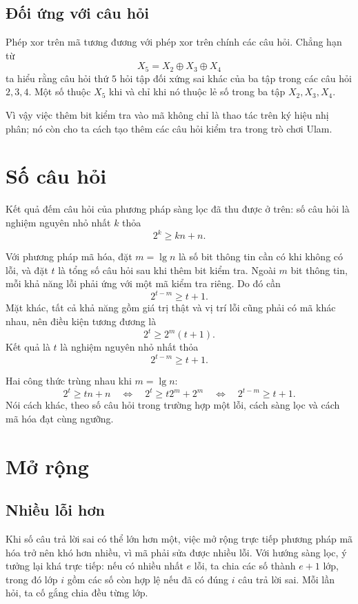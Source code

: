 \documentclass[11pt]{article}
\newcommand{\xor}{\oplus}
\begin{document}
\subsection{Đối ứng với câu hỏi}

Phép xor trên mã tương đương với phép xor trên chính các câu hỏi. Chẳng hạn
từ
\[
  X_5 = X_2 \xor X_3 \xor X_4
\]
ta hiểu rằng câu hỏi thứ \(5\) hỏi tập đối xứng sai khác của ba tập trong
các câu hỏi \(2,3,4\). Một số thuộc \(X_5\) khi và chỉ khi nó thuộc lẻ số
trong ba tập \(X_2,X_3,X_4\).

Vì vậy việc thêm bit kiểm tra vào mã không chỉ là thao tác trên ký hiệu nhị
phân; nó còn cho ta cách tạo thêm các câu hỏi kiểm tra trong trò chơi Ulam.

\section{Số câu hỏi}

Kết quả đếm câu hỏi của phương pháp sàng lọc đã thu được ở trên: số câu hỏi
là nghiệm nguyên nhỏ nhất \(k\) thỏa
\[
  2^k \ge kn+n.
\]

Với phương pháp mã hóa, đặt \(m=\lg n\) là số bit thông tin cần có khi không
có lỗi, và đặt \(t\) là tổng số câu hỏi sau khi thêm bit kiểm tra. Ngoài
\(m\) bit thông tin, mỗi khả năng lỗi phải ứng với một mã kiểm tra riêng.
Do đó cần
\[
  2^{t-m}\ge t+1.
\]
Mặt khác, tất cả khả năng gồm giá trị thật và vị trí lỗi cũng phải có mã
khác nhau, nên điều kiện tương đương là
\[
  2^t \ge 2^m(t+1).
\]
Kết quả là \(t\) là nghiệm nguyên nhỏ nhất thỏa
\[
  2^{t-m}\ge t+1.
\]

Hai công thức trùng nhau khi \(m=\lg n\):
\[
  2^t\ge tn+n
  \quad\Longleftrightarrow\quad
  2^t\ge t2^m+2^m
  \quad\Longleftrightarrow\quad
  2^{t-m}\ge t+1.
\]
Nói cách khác, theo số câu hỏi trong trường hợp một lỗi, cách sàng lọc và
cách mã hóa đạt cùng ngưỡng.

\section{Mở rộng}

\subsection{Nhiều lỗi hơn}

Khi số câu trả lời sai có thể lớn hơn một, việc mở rộng trực tiếp phương pháp
mã hóa trở nên khó hơn nhiều, vì mã phải sửa được nhiều lỗi. Với hướng sàng
lọc, ý tưởng lại khá trực tiếp: nếu có nhiều nhất \(e\) lỗi, ta chia các số
thành \(e+1\) lớp, trong đó lớp \(i\) gồm các số còn hợp lệ nếu đã có đúng
\(i\) câu trả lời sai. Mỗi lần hỏi, ta cố gắng chia đều từng lớp.
\end{document}
